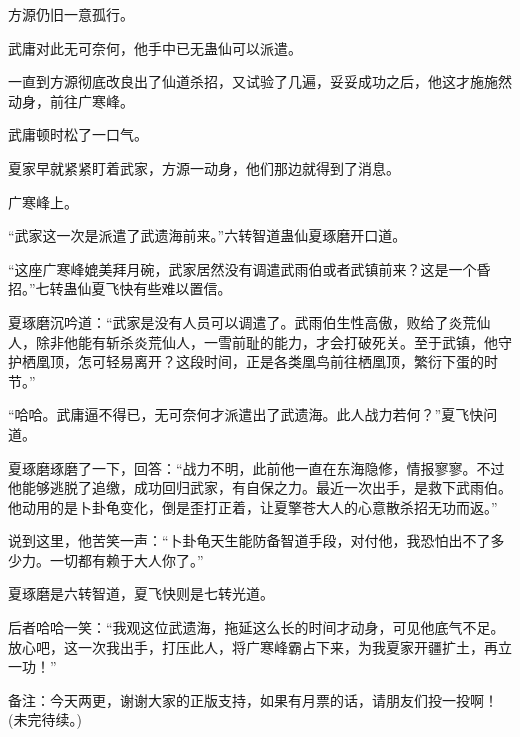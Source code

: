 \begin{this_body}
方源仍旧一意孤行。

武庸对此无可奈何，他手中已无蛊仙可以派遣。

一直到方源彻底改良出了仙道杀招，又试验了几遍，妥妥成功之后，他这才施施然动身，前往广寒峰。

武庸顿时松了一口气。

夏家早就紧紧盯着武家，方源一动身，他们那边就得到了消息。

广寒峰上。

“武家这一次是派遣了武遗海前来。”六转智道蛊仙夏琢磨开口道。

“这座广寒峰媲美拜月碗，武家居然没有调遣武雨伯或者武镇前来？这是一个昏招。”七转蛊仙夏飞快有些难以置信。

夏琢磨沉吟道：“武家是没有人员可以调遣了。武雨伯生性高傲，败给了炎荒仙人，除非他能有斩杀炎荒仙人，一雪前耻的能力，才会打破死关。至于武镇，他守护栖凰顶，怎可轻易离开？这段时间，正是各类凰鸟前往栖凰顶，繁衍下蛋的时节。”

“哈哈。武庸逼不得已，无可奈何才派遣出了武遗海。此人战力若何？”夏飞快问道。

夏琢磨琢磨了一下，回答：“战力不明，此前他一直在东海隐修，情报寥寥。不过他能够逃脱了追缴，成功回归武家，有自保之力。最近一次出手，是救下武雨伯。他动用的是卜卦龟变化，倒是歪打正着，让夏擎苍大人的心意散杀招无功而返。”

说到这里，他苦笑一声：“卜卦龟天生能防备智道手段，对付他，我恐怕出不了多少力。一切都有赖于大人你了。”

夏琢磨是六转智道，夏飞快则是七转光道。

后者哈哈一笑：“我观这位武遗海，拖延这么长的时间才动身，可见他底气不足。放心吧，这一次我出手，打压此人，将广寒峰霸占下来，为我夏家开疆扩土，再立一功！”

备注：今天两更，谢谢大家的正版支持，如果有月票的话，请朋友们投一投啊！(未完待续。)

\end{this_body}

